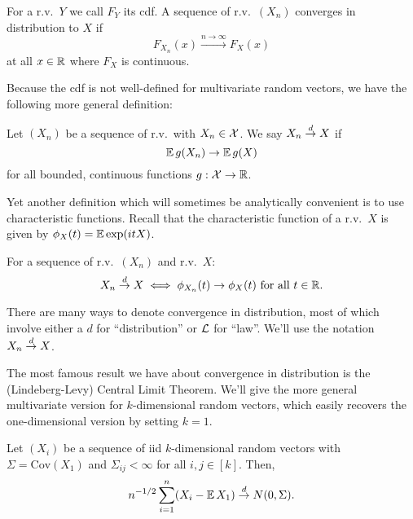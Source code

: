 \begin{definition}
    For a r.v.\ $Y$ we call $F_Y$ its cdf.
    A sequence of r.v.\ $(X_n)$ converges in distribution to $X$ if 
    \[
        F_{X_n}(x)
        \stackrel{n \rightarrow \infty}{\rightarrow}
        F_X(x)
    \]
    at all $x \in \mathbb R$ where $F_X$ is continuous.
\end{definition}

Because the cdf is not well-defined for multivariate random vectors, we have the 
following more general definition:

\begin{definition}
    Let $(X_n)$ be a sequence of r.v.\ with $X_n \in \mathcal X$. We say 
    $X_n \overset{d}{\rightarrow} X$ if 
    \[
        \operatorname*{\mathbb{E}} g(X_n)
        \rightarrow 
        \operatorname*{\mathbb{E}} g(X)
    \]
    for all bounded, continuous functions $g: \mathcal X \rightarrow \mathbb R$.
\end{definition}

Yet another definition which will sometimes be analytically convenient is to 
use characteristic functions. Recall that the characteristic function of a 
r.v.\ $X$ is given by $\phi_X(t) = \operatorname*{\mathbb{E}} \exp(itX)$.

\begin{theorem}
    For a sequence of r.v.\ $(X_n)$ and r.v.\ $X$:
    \[
        X_n \overset{d}{\rightarrow} X
        \iff 
        \phi_{X_n}(t) \rightarrow \phi_{X}(t) \text{ for all } t \in \mathbb R.
    \]
\end{theorem}

There are many ways to denote convergence in distribution, most of which involve 
either a $d$ for ``distribution'' or $\mathcal L$ for ``law''. We'll use the notation 
$X_n \overset{d}{\rightarrow} X$.

The most famous result we have about convergence in distribution is the 
(Lindeberg-Levy) Central Limit Theorem. We'll give the more general multivariate 
version for $k$-dimensional random vectors, which easily recovers the one-dimensional 
version by setting $k=1$.

\begin{theorem}
    Let $(X_i)$ be a sequence of iid $k$-dimensional random vectors 
    with $\Sigma = \text{Cov}(X_1)$ and $\Sigma_{ij} < \infty$ for all $i,j \in [k]$.
    Then,
    \[
        n^{-1/2} \sum_{i=1}^{n} (X_i - \operatorname*{\mathbb{E}} X_1)
        \overset{d}{\rightarrow} 
        N(0, \Sigma).
    \]
\end{theorem}

